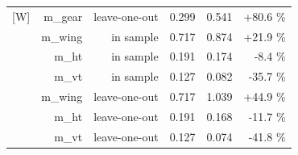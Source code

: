 \begin{table}[htbp]
{\begin{tabular}{lrrrrr}
[W] & m\_gear & leave-one-out & 0.299 & 0.541 & +80.6 \% \\
[HB] & m\_wing & in sample & 0.717 & 0.874 & +21.9 \% \\
[HB] & m\_ht & in sample & 0.191 & 0.174 & -8.4 \% \\
[HB] & m\_vt & in sample & 0.127 & 0.082 & -35.7 \% \\
[HB] & m\_wing & leave-one-out & 0.717 & 1.039 & +44.9 \% \\
[HB] & m\_ht & leave-one-out & 0.191 & 0.168 & -11.7 \% \\
[HB] & m\_vt & leave-one-out & 0.127 & 0.074 & -41.8 \% \\
\bottomrule
\end{tabular}}
\end{table}
